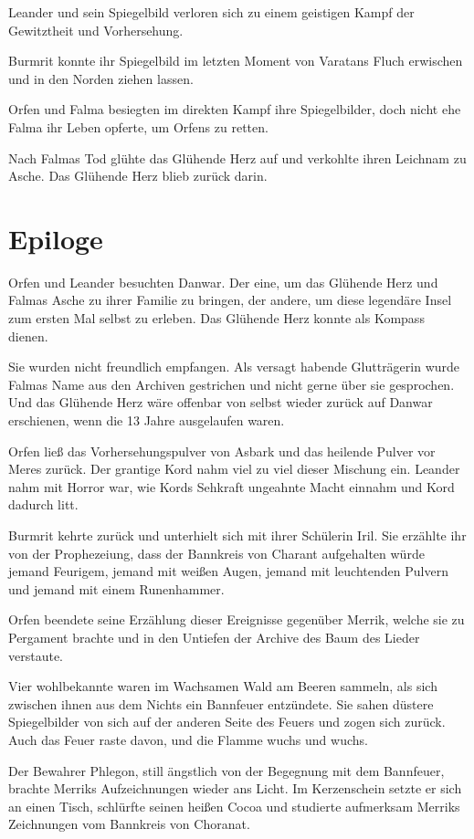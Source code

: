 Leander und sein Spiegelbild verloren sich zu einem geistigen Kampf der Gewitztheit und Vorhersehung.

Burmrit konnte ihr Spiegelbild im letzten Moment von Varatans Fluch erwischen und in den Norden ziehen lassen.

Orfen und Falma besiegten im direkten Kampf ihre Spiegelbilder, doch nicht ehe Falma ihr Leben opferte, um Orfens zu retten.

Nach Falmas Tod glühte das Glühende Herz auf und verkohlte ihren Leichnam zu Asche. Das Glühende Herz blieb zurück darin.


\newpage
\section{Epiloge}

Orfen und Leander besuchten Danwar. Der eine, um das Glühende Herz und Falmas Asche zu ihrer Familie zu bringen, der andere, um diese legendäre Insel zum ersten Mal selbst zu erleben. Das Glühende Herz konnte als Kompass dienen.

Sie wurden nicht freundlich empfangen. Als versagt habende Glutträgerin wurde Falmas Name aus den Archiven gestrichen und nicht gerne über sie gesprochen. Und das Glühende Herz wäre offenbar von selbst wieder zurück auf Danwar erschienen, wenn die 13 Jahre ausgelaufen waren.

Orfen ließ das Vorhersehungspulver von Asbark und das heilende Pulver vor Meres zurück. Der grantige Kord nahm viel zu viel dieser Mischung ein. Leander nahm mit Horror war, wie Kords Sehkraft ungeahnte Macht einnahm und Kord dadurch litt.


\trennzeichen

Burmrit kehrte zurück und unterhielt sich mit ihrer Schülerin Iril. Sie erzählte ihr von der Prophezeiung, dass der Bannkreis von Charant aufgehalten würde jemand Feurigem, jemand mit weißen Augen, jemand mit leuchtenden Pulvern und jemand mit einem Runenhammer.



\trennzeichen

Orfen beendete seine Erzählung dieser Ereignisse gegenüber Merrik, welche sie zu Pergament brachte und in den Untiefen der Archive des Baum des Lieder verstaute.



Vier wohlbekannte  waren im Wachsamen Wald am Beeren sammeln, als sich zwischen ihnen aus dem Nichts ein Bannfeuer entzündete. Sie sahen düstere Spiegelbilder von sich auf der anderen Seite des Feuers und zogen sich zurück. Auch das Feuer raste davon, und die Flamme wuchs und wuchs.

\trennzeichen

Der Bewahrer Phlegon, still ängstlich von der Begegnung mit dem Bannfeuer, brachte Merriks Aufzeichnungen wieder ans Licht. Im Kerzenschein setzte er sich an einen Tisch, schlürfte seinen heißen Cocoa und studierte aufmerksam Merriks Zeichnungen vom Bannkreis von Choranat.




